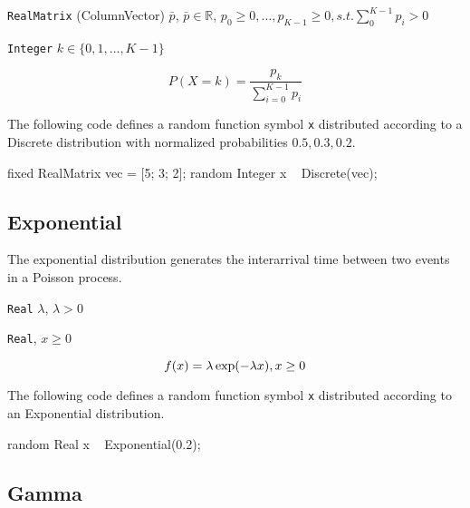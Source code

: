 \begin{itemize*}
\item[] \verb|RealMatrix| (ColumnVector) $\bar{p}$, $\bar{p} \in \mathbb{R}$, $p_{0} \geq 0, \ldots, p_{K-1} \geq 0, s.t. \sum_{0}^{K-1} p_{i} > 0$
\end{itemize*}

\begin{itemize*}
\item[] \verb|Integer| $k \in \{0, 1, \ldots, K-1 \}$ 
\end{itemize*}

\[
	P(X = k) = \frac{p_{k}}{\sum_{i=0}^{K -1} p_{i}}
\]

The following code defines a random function symbol \verb|x| distributed according to a Discrete distribution with normalized probabilities $0.5, 0.3, 0.2$.
\begin{blogcode}
fixed RealMatrix vec = [5; 3; 2];
random Integer x ~ Discrete(vec);
\end{blogcode}

\subsection{Exponential}
The exponential distribution generates the interarrival time between two events in a Poisson process.

\begin{itemize*}
\item[] \verb|Real|
 $\lambda$, $\lambda > 0$ 
\end{itemize*}
\begin{itemize*}
\item[] \verb|Real|, $x \geq 0$ 
\end{itemize*}

\[
	f(x) = \lambda \exp(-\lambda x) , x \geq 0 \\
\]

The following code defines a random function symbol \verb|x| distributed according to an Exponential distribution.
\begin{blogcode}
random Real x ~ Exponential(0.2);
\end{blogcode}

\subsection{Gamma}

